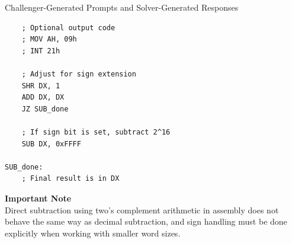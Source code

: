 \documentclass[]{fairmeta}
\begin{document}
\begin{darkbluebox}{Challenger-Generated Prompts and Solver-Generated Responses}
{{\begin{verbatim}
    ; Optional output code
    ; MOV AH, 09h
    ; INT 21h

    ; Adjust for sign extension
    SHR DX, 1
    ADD DX, DX
    JZ SUB_done

    ; If sign bit is set, subtract 2^16
    SUB DX, 0xFFFF

SUB_done:
    ; Final result is in DX
\end{verbatim}

\textbf{Important Note} \\
Direct subtraction using two's complement arithmetic in assembly does not behave the same way as decimal subtraction, and sign handling must be done explicitly when working with smaller word sizes.
    
 }}
\end{darkbluebox}
\end{document}
